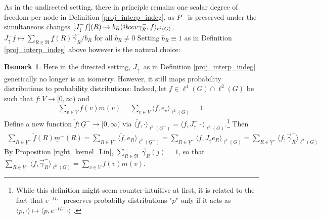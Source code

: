 \documentclass[reqno,12pt,letterpaper]{amsart}
\makeatletter
\numberwithin{equation}{section}
\newcommand{\Lin}{L^{-}}
\DeclareRobustCommand{\cev}[1]{%
	\mathpalette\do@cev{#1}%
}
\newcommand{\do@cev}[2]{%
	\fix@cev{#1}{+}%
	\reflectbox{$\m@th#1\vec{\reflectbox{$\fix@cev{#1}{-}\m@th#1#2\fix@cev{#1}{+}$}}$}%
	\fix@cev{#1}{-}%
}
\newcommand{\fix@cev}[2]{%
	\ifx#1\displaystyle
	\mkern#23mu
	\else
	\ifx#1\textstyle
	\mkern#23mu
	\else
	\ifx#1\scriptstyle
	\mkern#22mu
	\else
	\mkern#22mu
	\fi
	\fi
	\fi
}
\newcommand{\1}{\mathds{1}}
\theoremstyle{definition}
\newtheorem{Rem}[Th]{Remark}
\makeatother
\begin{document}
	 As in the undirected setting, there in principle remains one scalar degree of freedom per node in Definition \ref{proj_interp_indeg}, as $P^-$ is preserved under the simultaneous changes 
	 $[J^-_\downarrow f](R) \mapsto b_R \langle \cev\gamma^{-}_{R} , f \rangle_{\ell^2(G)}$, $J^-_\uparrow \underline{f} \mapsto \sum_{R \in \mathfrak{R}} \underline{f}(R)  \vec\gamma^{-}_{R}/b_R$ for all $b_R\neq 0$ Setting $b_R \equiv 1$ as in Definition \ref{proj_interp_indeg} above however is the natural choice:
	 \begin{Rem}\label{norm_preservation_rem_-}
	Here in the directed setting, $J^-_\uparrow$ as in Definition \ref{proj_interp_indeg} generically no longer is an isometry. However, it still maps probability distributions to probability distributions: Indeed, let $f \in \ell^1(G) \cap \ell^2(G)$ be such that $f: V \rightarrow   [0,\infty )$ and 
	\begin{align}
	\sum_{v \in V} f(v) m(v)  =	\sum_{v \in V} \langle f, e_v \rangle_{\ell^2(G)} =  1.
	\end{align}
Define a new function $\check{f}: \underline{G}^- \rightarrow [0, \infty)$ via
$\langle \check{f},\cdot \rangle_{\ell^2(\underline{G}^-)} =  \langle f, J_\uparrow^- \cdot \rangle_{\ell^2(G)}$.\footnote{While this definition might seem counter-intuitive at first, it is related to the fact that $e^{-t \Lin}$ preserves probabilty distributions "$p$" only if it acts as $\langle p, \cdot \rangle \mapsto \langle p,e^{-t \Lin} \cdot \rangle $ \cite[Section 6]{Veerman2020APO}.} Then
\begin{align}
	\sum\limits_{R \in \underline{V}^-} \check{f}(R) \underline{m}^-(R) = 	\sum\limits_{R \in \underline{V}^-}  \langle \check{f}, e_R \rangle_{\ell^2(\underline{G}^-)}
=
\sum\limits_{R \in \underline{V}^-}  \langle f, J_\uparrow e_R \rangle_{\ell^2(G)}
= \sum\limits_{R \in \underline{V}^-}  \langle f, \vec\gamma^{-}_{R} \rangle_{\ell^2(G)} 
\end{align}
By Proposition  \ref{right_kernel_Lin},  $\sum_{R \in \mathfrak{R}}\,	\vec\gamma^{-}_{R}(j) = 1$, so that $\sum_{R \in \underline{V}^-}  \langle f, \vec\gamma^{-}_{R} \rangle_{\ell^2(G)}  = \sum_{v \in V} f(v) m(v)$.



\end{Rem}
\end{document}
